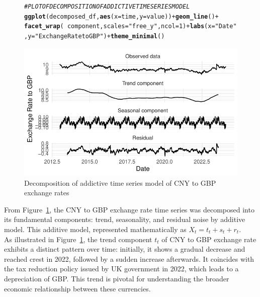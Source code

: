 \documentclass{article}\usepackage[]{graphicx}\usepackage[]{xcolor}
\makeatletter
\def\maxwidth{ %
  \ifdim\Gin@nat@width>\linewidth
    \linewidth
  \else
    \Gin@nat@width
  \fi
}
\newcommand{\hlnum}[1]{\textcolor[rgb]{0.686,0.059,0.569}{#1}}%
\newcommand{\hlstr}[1]{\textcolor[rgb]{0.192,0.494,0.8}{#1}}%
\newcommand{\hlcom}[1]{\textcolor[rgb]{0.678,0.584,0.686}{\textit{#1}}}%
\newcommand{\hlopt}[1]{\textcolor[rgb]{0,0,0}{#1}}%
\newcommand{\hlstd}[1]{\textcolor[rgb]{0.345,0.345,0.345}{#1}}%
\newcommand{\hlkwc}[1]{\textcolor[rgb]{0.333,0.667,0.333}{#1}}%
\newcommand{\hlkwd}[1]{\textcolor[rgb]{0.737,0.353,0.396}{\textbf{#1}}}%
\newenvironment{kframe}{%
 \def\at@end@of@kframe{}%
 \ifinner\ifhmode%
  \def\at@end@of@kframe{\end{minipage}}%
  \begin{minipage}{\columnwidth}%
 \fi\fi%
 \def\FrameCommand##1{\hskip\@totalleftmargin \hskip-\fboxsep
 \colorbox{shadecolor}{##1}\hskip-\fboxsep
     \hskip-\linewidth \hskip-\@totalleftmargin \hskip\columnwidth}%
 \MakeFramed {\advance\hsize-\width
   \@totalleftmargin\z@ \linewidth\hsize
   \@setminipage}}%
 {\par\unskip\endMakeFramed%
 \at@end@of@kframe}
\newenvironment{knitrout}{}{} %
\numberwithin{equation}{section}
\makeatother
\begin{document}
\begin{figure}[H]
\begin{knitrout}\scriptsize
{}\color{fgcolor}\begin{kframe}
\begin{alltt}
\hlcom{# PLOT OF DECOMPOSITION OF ADDICTIVE TIME SERIES MODEL}
\hlkwd{ggplot}\hlstd{(decomposed_df,} \hlkwd{aes}\hlstd{(}\hlkwc{x} \hlstd{= time,} \hlkwc{y} \hlstd{= value))} \hlopt{+} \hlkwd{geom_line}\hlstd{()} \hlopt{+}
  \hlkwd{facet_wrap}\hlstd{(}\hlopt{~}\hlstd{component,} \hlkwc{scales} \hlstd{=} \hlstr{"free_y"}\hlstd{,} \hlkwc{ncol} \hlstd{=} \hlnum{1}\hlstd{)} \hlopt{+} \hlkwd{labs}\hlstd{(}\hlkwc{x} \hlstd{=} \hlstr{"Date"}\hlstd{,}\hlkwc{y} \hlstd{=} \hlstr{"Exchange Rate to GBP"}\hlstd{)} \hlopt{+} \hlkwd{theme_minimal}\hlstd{()}
\end{alltt}
\end{kframe}

{\centering \includegraphics[width=\maxwidth]{figure/beamer-unnamed-chunk-4-1} 

}


\end{knitrout}
\centering
\caption{Decomposition of addictive time series model of CNY to GBP exchange rates}
\label{fig:decomposition of time series}
\end{figure}

\noindent
From Figure~\ref{fig:decomposition of time series}, the CNY to GBP exchange rate time series was decomposed into its fundamental components: trend, seasonality, and residual noise by additive model. This additive model, represented mathematically as $X_t = t_t + s_t + r_t$.\\

\noindent
As illustrated in Figure~\ref{fig:decomposition of time series}, the trend component $t_t$ of CNY to GBP exchange rate exhibits a distinct pattern over time: initially, it shows a gradual decrease and reached crest in 2022, followed by a sudden increase afterwards. It coincides with the tax reduction policy issued by UK government in 2022, which leads to a depreciation of GBP. This trend is pivotal for understanding the broader economic relationship between these currencies. \\
\end{document}

